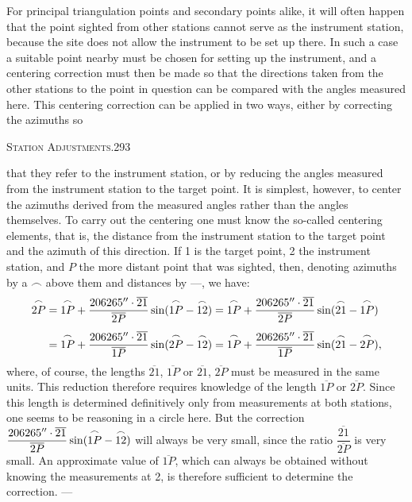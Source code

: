For principal triangulation points and secondary points alike, it will often happen that the point sighted from other stations cannot serve as the instrument station, because the site does not allow the instrument to be set up there. In such a case a suitable point nearby must be chosen for setting up the instrument, and a centering correction must then be made so that the directions taken from the other stations to the point in question can be compared with the angles measured here. This centering correction can be applied in two ways, either by correcting the azimuths  so

\clearpage
\noindent\mbox{}\hfill\textsc{Station Adjustments.}\hfill293\par\medskip
\noindent that they refer to the instrument station, or by reducing the angles measured from the instrument station to the target point. It is simplest, however, to center the azimuths derived from the measured angles rather than the angles themselves. To carry out the centering one must know the so-called centering elements, that is, the distance from the instrument station to the target point and the azimuth of this direction. If 1 is the target point, 2 the instrument station, and $P$ the more distant point that was sighted, then, denoting azimuths by a $\frown$ above them and distances by ---, we have:
\[
\begin{aligned}
\overset{\frown}{2P}&=\overset{\frown}{1P}+\frac{206265''\cdot\overline{21}}{\overline{2P}}\sin(\overset{\frown}{1P}-\overset{\frown}{12})
=\overset{\frown}{1P}+\frac{206265''\cdot\overline{21}}{\overline{2P}}\sin(\overset{\frown}{21}-\overset{\frown}{1P})\\[4pt]
&=\overset{\frown}{1P}+\frac{206265''\cdot\overline{21}}{\overline{1P}}\sin(\overset{\frown}{2P}-\overset{\frown}{12})
=\overset{\frown}{1P}+\frac{206265''\cdot\overline{21}}{\overline{1P}}\sin(\overset{\frown}{21}-\overset{\frown}{2P}),
\end{aligned}
\]
where, of course, the lengths $\overline{21}$, $\overline{1P}$ or $\overline{21}$, $\overline{2P}$ must be measured in the same units. This reduction therefore requires knowledge of the length $\overline{1P}$ or $\overline{2P}$. Since this length is determined definitively only from measurements at both stations, one seems to be reasoning in a circle here. But the correction $\dfrac{206265''\cdot\overline{21}}{\overline{2P}}\sin(\overset{\frown}{1P}-\overset{\frown}{12})$ will always be very small, since the ratio $\dfrac{\overline{21}}{\overline{2P}}$ is very small. An approximate value of $\overline{1P}$, which can always be obtained without knowing the measurements at 2, is therefore sufficient to determine the correction. ---

